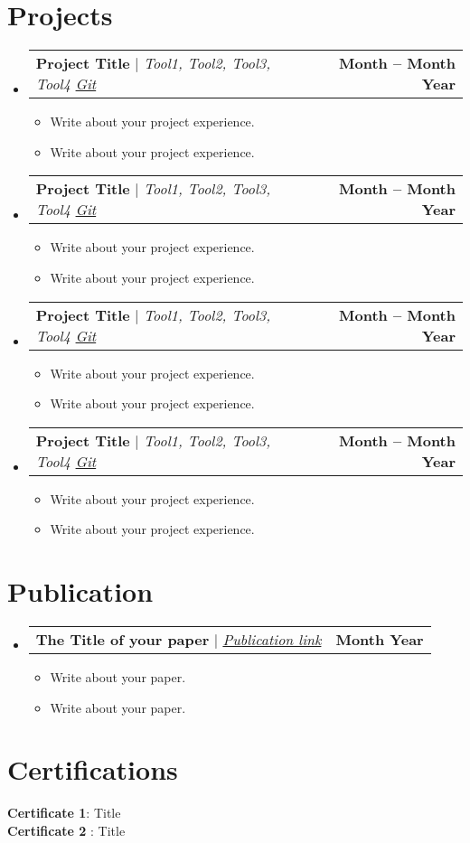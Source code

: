 \documentclass[letterpaper,11pt]{article}
\makeatletter
\newcommand{\resumeItem}[1]{
  \item\small{
    {#1 \vspace{-2pt}}
  }
}
\newcommand{\resumeProjectHeading}[2]{
    \item
    \begin{tabular*}{1.001\textwidth}{l@{\extracolsep{\fill}}r}
      \small#1 & \textbf{\small #2}\\
    \end{tabular*}\vspace{-7pt}
}
\newcommand{\resumeSubHeadingListStart}{\begin{itemize}[leftmargin=0.0in, label={}]}
\newcommand{\resumeSubHeadingListEnd}{\end{itemize}}
\newcommand{\resumeItemListStart}{\begin{itemize}}
\newcommand{\resumeItemListEnd}{\end{itemize}\vspace{-5pt}}
\makeatother
\begin{document}
\section{Projects}
    \vspace{-6pt}
    \resumeSubHeadingListStart
    \resumeProjectHeading
          {\textbf{Project Title} $|$ \emph{Tool1, Tool2, Tool3, Tool4 \href{https://github.com/}{Git}}}{Month -- Month Year}
          \resumeItemListStart
            \resumeItem{ Write about your project experience.}
            \resumeItem{ Write about your project experience.}
          \resumeItemListEnd
          \vspace{-14pt}
    \resumeProjectHeading
          {\textbf{Project Title} $|$ \emph{Tool1, Tool2, Tool3, Tool4 \href{https://github.com/}{Git}}}{Month -- Month Year}
          \resumeItemListStart
            \resumeItem{ Write about your project experience.}
            \resumeItem{ Write about your project experience.}
          \resumeItemListEnd
          \vspace{-14pt}
    \resumeProjectHeading
          {\textbf{Project Title} $|$ \emph{Tool1, Tool2, Tool3, Tool4 \href{https://github.com/}{Git}}}{Month -- Month Year}
          \resumeItemListStart
            \resumeItem{ Write about your project experience.}
            \resumeItem{ Write about your project experience.}
          \resumeItemListEnd
          \vspace{-14pt}
    \resumeProjectHeading
          {\textbf{Project Title} $|$ \emph{Tool1, Tool2, Tool3, Tool4 \href{https://github.com/}{Git}}}{Month -- Month Year}
          \resumeItemListStart
            \resumeItem{ Write about your project experience.}
            \resumeItem{ Write about your project experience.}
          \resumeItemListEnd
          \vspace{-14pt}
    \resumeSubHeadingListEnd
\vspace{-3pt}


\section{Publication}
\vspace{-6pt}
    \resumeSubHeadingListStart
    \resumeProjectHeading
    {\textbf{The Title of your paper} $|$ \emph{\href{https://www.researchgate.net}{Publication link}}}{Month Year}
    \resumeItemListStart
            \resumeItem{Write about your paper.}
            \resumeItem{Write about your paper.}
          \resumeItemListEnd
    \resumeSubHeadingListEnd
\vspace{-16pt}

\section{Certifications}
\textbf{Certificate 1}{: Title} \\
\textbf{Certificate 2} {: Title}
\end{document}
